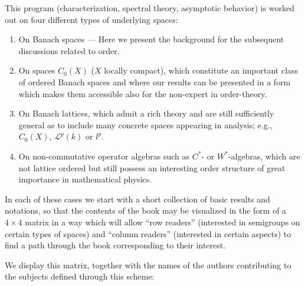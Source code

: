 This program (characterization, spectral theory, asymptotic behavior) is worked out on four different types of underlying spaces:
\begin{enumerate}[label=(\Alph*)]
\item 
On Banach spaces --- Here we present the background for the subsequent discussions related to order.

\item 
On spaces $C_{0}(X)$ ($X$ locally compact), which constitute an important class of ordered Banach spaces and where our results can be presented in a form which makes them accessible also for the non-expert in order-theory.

\item 
On Banach lattices, which admit a rich theory and are still sufficiently general as to include many concrete spaces appearing in analysis; e.g., $C_0(X)$, $\mathcal{L}^p(k)$ or $l^p$.

\item 
On non-commutative operator algebras such as $C^*$- or $W^*$-algebras, which are not lattice ordered but still possess an interesting order structure of great importance in mathematical physics.

\end{enumerate}

In each of these cases we start with a short collection of basic results and notations, so that the contents of the book may be visualized in the form of a $4 \times 4$ matrix in a way which will allow \enquote{row readers} (interested in semigroups on certain types of spaces) and \enquote{column readers} (interested in certain aspects) to find a path through the book corresponding to their interest.

We display this matrix, together with the names of the authors contributing to the subjects defined through this scheme:

